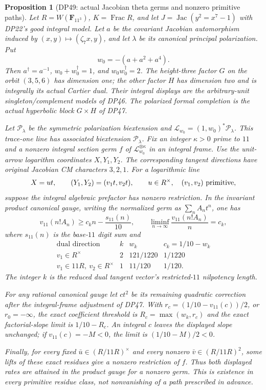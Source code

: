 \documentclass[11pt,a4paper]{article}
\newtheorem{proposition}[theorem]{Proposition}
\theoremstyle{definition}\newtheorem{remark}[theorem]{Remark}
\begin{document}
\begin{proposition}[DP49: actual Jacobian theta germs and nonzero primitive paths]\label{DP49}
Let $R=W(\mathbf F_{11^3})$, $K=\operatorname{Frac}R$, and let
$J=\operatorname{Jac}(y^2=x^7-1)$ with DP22's good integral model.
Let $a$ be the covariant Jacobian automorphism induced by
$(x,y)\mapsto(\zeta_7x,y)$, and let $\lambda$ be its canonical principal polarization.
Put
\[
 w_0=-(a+a^2+a^4).
\]
Then $a^\dagger=a^{-1}$, $w_0+w_0^\dagger=1$, and $w_0w_0^\dagger=2$.
The height-three factor $G$ on the orbit $(3,5,6)$ has dimension one; the other factor $H$ has dimension two and is integrally its actual Cartier dual.
Their integral displays are the arbitrary-unit singleton/complement models of DP46.
The polarized formal completion is the actual hyperbolic block $G\times H$ of DP47.

Let $\mathcal P_\lambda$ be the symmetric polarization biextension and
$\mathcal L_{w_0}=(1,w_0)^*\mathcal P_\lambda$.
This trace-one line has associated biextension $\mathcal P_\lambda$.
Fix an integer $\kappa>0$ prime to $11$ and a nonzero integral section germ $f$ of
$\mathcal L_{w_0}^{\otimes\kappa}$ in an integral frame.
Use the unit-arrow logarithm coordinates $X,Y_1,Y_2$.
The corresponding tangent directions have original Jacobian CM characters $3,2,1$.
For a logarithmic line
\[
 X=ut,\qquad (Y_1,Y_2)=(v_1t,v_2t),
 \qquad u\in R^\times,\quad (v_1,v_2)\ \hbox{primitive},
\]
suppose the integral algebraic prefactor has nonzero restriction.
In the invariant product canonical gauge, writing the normalized germ as
$\sum_n A_nt^n$, one has
\[
 v_{11}(n!A_n)\ge c_kn-\frac{s_{11}(n)}{10},
 \qquad
 \liminf_{n\to\infty}\frac{v_{11}(n!A_n)}n=c_k,
\]
where $s_{11}(n)$ is the base-$11$ digit sum and
\[
\begin{array}{c|c|c|c}
\text{dual direction}&k&w_k&c_k=1/10-w_k\\ \hline
v_1\in R^\times&2&121/1220&1/1220\\
v_1\in11R,\ v_2\in R^\times&1&11/120&1/120 .
\end{array}
\]
The integer $k$ is the reduced dual tangent vector's restricted-$11$ nilpotency length.

For any rational canonical gauge let $ct^2$ be its remaining quadratic correction after the integral-frame adjustment of DP47.
With $r_c=(1/10-v_{11}(c))/2$, or $r_0=-\infty$, the exact coefficient threshold is
$R_c=\max(w_k,r_c)$ and the exact factorial-slope limit is $1/10-R_c$.
An integral $c$ leaves the displayed slope unchanged; if $v_{11}(c)=-M<0$, the limit is
$(1/10-M)/2<0$.

Finally, for every fixed $\bar u\in(R/11R)^\times$ and every nonzero
$\bar v\in(R/11R)^2$, some lifts of these exact residues give a nonzero restriction of $f$.
Thus both displayed rates are attained in the product gauge for a nonzero germ.
This is existence in every primitive residue class, not nonvanishing of a path prescribed in advance.
\end{proposition}
\end{document}

